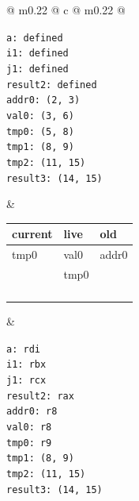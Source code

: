 \begin{figure}[H]
    \centering
    \small
    \begin{tabularx}{\textwidth}{@{} m{} @{\extracolsep{\fill}} c @{\extracolsep{\fill}} m{} @{}}
        \begin{tcolorbox}[standard jigsaw, opacityback=0, colframe=black, arc=4mm, width=\linewidth, height=6.2cm, valign=center, left=2pt, right=2pt]
            \texttt{\small a: defined \\ i1: defined \\ j1: defined \\ result2: defined \\ addr0: (2, 3) \\ val0: (3, 6) \\ tmp0: (5, 8) \\ tmp1: (8, 9) \\ tmp2: (11, 15) \\ result3: (14, 15)}
        \end{tcolorbox} 
        & 
        \renewcommand{\arraystretch}{1.3}
        \begin{tabular}{|p{2cm}|p{2cm}|p{2cm}|}
            \hline
            \textbf{current} & \textbf{live} & \textbf{old} \\ \hline
             tmp0   & val0  & addr0 \\ \hline
                    & tmp0   &       \\ \hline
                    &       &       \\ \hline
                    &       &       \\ \hline
                    &       &       \\ \hline
            & & \\ \hline
        \end{tabular} 
        & 
        \begin{tcolorbox}[standard jigsaw, opacityback=0, colframe=black, arc=4mm, width=\linewidth, height=6.2cm, valign=center, left=2pt, right=2pt]
            \texttt{\small a: rdi \\ i1: rbx \\ j1: rcx \\ result2: rax \\ addr0: r8 \\ val0: r8 \\ tmp0: r9 \\ tmp1: (8, 9) \\ tmp2: (11, 15) \\ result3: (14, 15)}
        \end{tcolorbox} \\
    \end{tabularx}
\end{figure}


